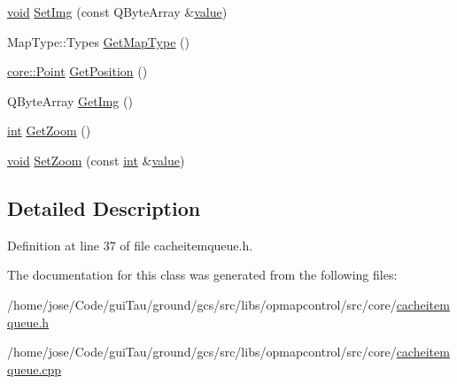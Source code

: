 \begin{DoxyCompactItemize}
\item 
\hyperlink{group___u_a_v_objects_plugin_ga444cf2ff3f0ecbe028adce838d373f5c}{void} \hyperlink{group___o_p_map_widget_gaf1ff6340158da1ba5139ba7c442758cd}{Set\-Img} (const Q\-Byte\-Array \&\hyperlink{glext_8h_aa0e2e9cea7f208d28acda0480144beb0}{value})
\item 
Map\-Type\-::\-Types \hyperlink{group___o_p_map_widget_gac72aa0d2725fa7a43d69620e086eb6b4}{Get\-Map\-Type} ()
\item 
\hyperlink{structcore_1_1_point}{core\-::\-Point} \hyperlink{group___o_p_map_widget_ga1fa7cca0baacf348206a3f015041f07b}{Get\-Position} ()
\item 
Q\-Byte\-Array \hyperlink{group___o_p_map_widget_ga6a02a2e0a6cefcd82c2fad88dcdbd89e}{Get\-Img} ()
\item 
\hyperlink{ioapi_8h_a787fa3cf048117ba7123753c1e74fcd6}{int} \hyperlink{group___o_p_map_widget_gadfe7e49ddc244b2d8b26f9087d954f7d}{Get\-Zoom} ()
\item 
\hyperlink{group___u_a_v_objects_plugin_ga444cf2ff3f0ecbe028adce838d373f5c}{void} \hyperlink{group___o_p_map_widget_ga0780a9a7876dc6fbb7aa3bc7b5465956}{Set\-Zoom} (const \hyperlink{ioapi_8h_a787fa3cf048117ba7123753c1e74fcd6}{int} \&\hyperlink{glext_8h_aa0e2e9cea7f208d28acda0480144beb0}{value})
\end{DoxyCompactItemize}


\subsection{Detailed Description}


Definition at line 37 of file cacheitemqueue.\-h.



The documentation for this class was generated from the following files\-:\begin{DoxyCompactItemize}
\item 
/home/jose/\-Code/gui\-Tau/ground/gcs/src/libs/opmapcontrol/src/core/\hyperlink{cacheitemqueue_8h}{cacheitemqueue.\-h}\item 
/home/jose/\-Code/gui\-Tau/ground/gcs/src/libs/opmapcontrol/src/core/\hyperlink{cacheitemqueue_8cpp}{cacheitemqueue.\-cpp}\end{DoxyCompactItemize}
